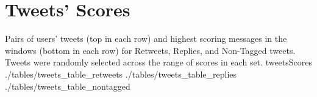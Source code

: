 \chapter{Tweets' Scores}
\onecolumn
\appendix
\tweetTableFull
{Pairs of users' tweets (top in each row) and highest scoring messages in the windows (bottom in each row) for Retweets, Replies, and Non-Tagged tweets.  Tweets were randomly selected across the range of scores in each set.}
{tweetsScores}
{./tables/tweets_table_retweets}
{./tables/tweets_table_replies}
{./tables/tweets_table_nontagged}
